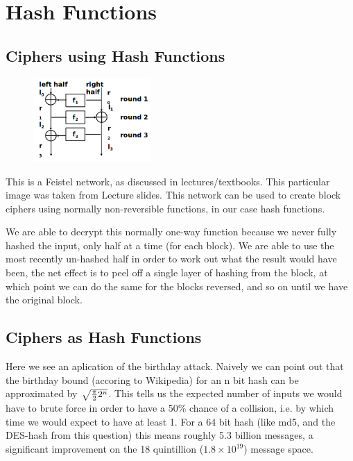 \documentclass{article}
\begin{document}
\section{Hash Functions}

\subsection{Ciphers using Hash Functions}

\begin{figure}[htb]
\begin{center}
\leavevmode
\includegraphics[width=0.4\textwidth]{feistel.png}
\end{center}
\label{fig:vortrap}
\end{figure}

This is a Feistel network, as discussed in lectures/textbooks.
This particular image was taken from Lecture slides.
This network can be used to create block ciphers using normally non-reversible functions, in our case hash functions.

We are able to decrypt this normally one-way function because we never fully hashed the input, only half at a time (for each block).
We are able to use the most recently un-hashed half in order to work out what the result would have been, the net effect is to peel off a single layer of hashing from the block, at which point we can do the same for the blocks reversed, and so on until we have the original block.

\subsection{Ciphers as Hash Functions}

Here we see an aplication of the birthday attack.
Naively we can point out that the birthday bound (accoring to Wikipedia) for an n bit hash can be approximated by $\sqrt{{\pi \over 2}2^n}$.
This tells us the expected number of inputs we would have to brute force in order to have a 50\% chance of a collision, i.e. by which time we would expect to have at least 1.
For a 64 bit hash (like md5, and the DES-hash from this question) this means roughly 5.3 billion messages, a significant improvement on the  18 quintillion ($1.8 \times 10^{19}$) message space.
\end{document}
